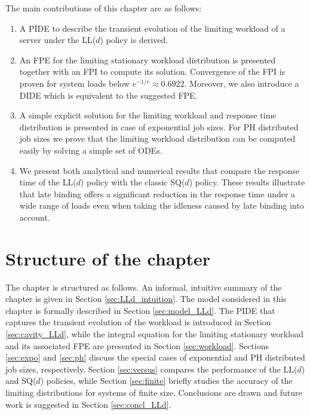 \documentclass[12pt]{report}
\begin{document}
The main contributions of this chapter are as follows:
\begin{enumerate}
\item A PIDE to describe the
transient evolution of the limiting workload of a server under the LL($d$) policy is derived.
\item An FPE for the limiting stationary workload distribution is presented together
with an FPI to compute its solution. Convergence of the FPI is proven for system loads below $e^{-1/e} \approx 0.6922$.
Moreover, we also introduce a DIDE which is equivalent to the suggested FPE.
\item A simple explicit solution for the limiting workload and response time distribution
is presented in case of exponential job sizes. For PH distributed job sizes we prove
that the limiting workload distribution can be computed easily by solving a simple set of 
ODEs.
\item We present both analytical and numerical results that compare the response time of the
LL($d$) policy with the classic SQ($d$) policy. These results illustrate that late binding offers a
significant reduction in the response time under a wide range of loads even when  taking the
idleness caused by late binding into account. 
\end{enumerate}

\section{Structure of the chapter}
The chapter is structured as follows. An informal, intuitive summary of the chapter is given in Section \ref{sec:LLd_intuition}. The model considered in this chapter is formally described in Section \ref{sec:model_LLd}.
The PIDE that captures the transient evolution of the workload is
introduced in Section \ref{sec:cavity_LLd}, while the integral equation for the limiting stationary workload 
and its associated FPE are presented in Section \ref{sec:workload}. Sections \ref{sec:expo} and \ref{sec:ph}
discuss the special cases of exponential and PH distributed job sizes, respectively.
Section \ref{sec:versus} compares the performance of the LL($d$) and SQ($d$) policies, while Section \ref{sec:finite}
briefly studies the accuracy of the limiting distributions for systems of finite size.
Conclusions are drawn
and future work is suggested in Section \ref{sec:concl_LLd}.
\end{document}
